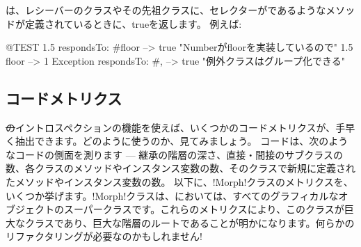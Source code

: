 \documentclass[a4paper,10pt,twoside]{book}
\begin{document}
は、レシーバーのクラスやその先祖クラスに、セレクターがであるようなメソッドが定義されているときに、trueを返します。 %
例えば:
\begin{code}{@TEST}
1.5 respondsTo: #floor      --> true    "Numberがfloorを実装しているので"
1.5 floor                            --> 1
Exception respondsTo: #, --> true    "例外クラスはグループ化できる"
\end{code}



\subsection{コードメトリクス}

\st のイントロスペクションの機能を使えば、いくつかのコードメトリクスが、手早く抽出できます。どのように使うのか、見てみましょう。
コードは、次のようなコードの側面を測ります --- 継承の階層の深さ、直接・間接のサブクラスの数、各クラスのメソッドやインスタンス変数の数、そのクラスで新規に定義されたメソッドやインスタンス変数の数。
以下に、\ct!Morph!クラスのメトリクスを、いくつか挙げます。\ct!Morph!クラスは、\pharo においては、すべてのグラフィカルなオブジェクトのスーパークラスです。これらのメトリクスにより、このクラスが巨大なクラスであり、巨大な階層のルートであることが明かになります。何らかのリファクタリングが必要なのかもしれません! 
\end{document}
